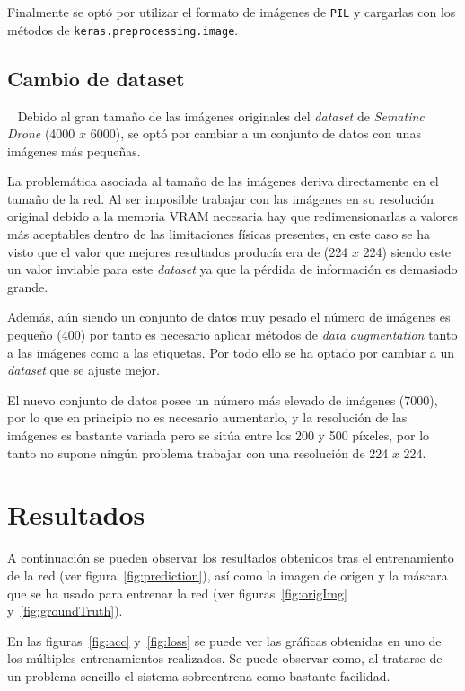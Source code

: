 \documentclass[a4paper]{article}
\begin{document}
Finalmente se optó por utilizar el formato de imágenes de \texttt{PIL} y cargarlas con los métodos de \texttt{keras.preprocessing.image}.

\subsection{Cambio de dataset}~\label{subsec:cambioDataset}
Debido al gran tamaño de las imágenes originales del \textit{dataset} de \textit{Sematinc Drone} (4000 $x$ 6000), se optó por cambiar a un conjunto de datos con unas imágenes más pequeñas.
\newline

La problemática asociada al tamaño de las imágenes deriva directamente en el tamaño de la red.
Al ser imposible trabajar con las imágenes en su resolución original debido a la memoria VRAM necesaria hay que redimensionarlas a valores más aceptables dentro de las limitaciones físicas presentes, en este caso se ha visto que el valor que mejores resultados producía era de (224 $x$ 224) siendo este un valor inviable para este \textit{dataset} ya que la pérdida de información es demasiado grande.
\newline

Además, aún siendo un conjunto de datos muy pesado el número de imágenes es pequeño (400) por tanto es necesario aplicar métodos de \textit{data augmentation} tanto a las imágenes como a las etiquetas.
Por todo ello se ha optado por cambiar a un \textit{dataset} que se ajuste mejor.
\newline

El nuevo conjunto de datos posee un número más elevado de imágenes (7000), por lo que en principio no es necesario aumentarlo, y la resolución de las imágenes es bastante variada pero se sitúa entre los 200 y 500 píxeles, por lo tanto no supone ningún problema trabajar con una resolución de 224 $x$ 224.


\newpage
\section{Resultados}
A continuación se pueden observar los resultados obtenidos tras el entrenamiento de la red (ver figura~\ref{fig:prediction}), así como la imagen de origen y la máscara que se ha usado para entrenar la red (ver figuras~\ref{fig:origImg} y~\ref{fig:groundTruth}).
\newline

En las figuras~\ref{fig:acc} y~\ref{fig:loss} se puede ver las gráficas obtenidas en uno de los múltiples entrenamientos realizados.
Se puede observar como, al tratarse de un problema sencillo el sistema sobreentrena como bastante facilidad.
\newline
\end{document}
